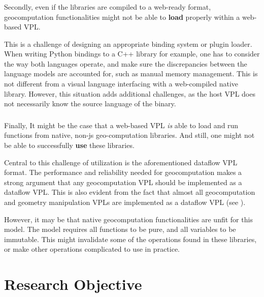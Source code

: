 \subsubsection*{\mySubRQThreeTitle}

Secondly, even if the libraries are compiled to a web-ready format, geocomputation functionalities might not be able to \textbf{load} properly within a web-based VPL.

This is a challenge of designing an appropriate binding system or plugin loader. 
When writing Python bindings to a C++ library for example, one has to consider the way both languages operate, and make sure the discrepancies between the language models are accounted for, such as manual memory management. 
This is not different from a visual language interfacing with a web-compiled native library. 
However, this situation adds additional challenges, as the host \ac{VPL} does not necessarily know the source language of the binary. 


\subsubsection*{\mySubRQFourTitle}

Finally, It might be the case that a web-based VPL \emph{is} able to load and run functions from native, non-js geo-computation libraries. 
And still, one might not be able to successfully \textbf{use} these libraries.

Central to this challenge of utilization is the aforementioned dataflow VPL format. 
The performance and reliability needed for geocomputation makes a strong argument that any geocomputation VPL should be implemented as a dataflow VPL. 
This is also evident from the fact that almost all geocomputation and geometry manipulation VPLs are implemented as a dataflow VPL (see ).

However, it may be that native geocomputation functionalities are unfit for this model. 
The model requires all functions to be pure, and all variables to be immutable. 
This might invalidate some of the operations found in these libraries, or make other operations complicated to use in practice.


\section{Research Objective}





